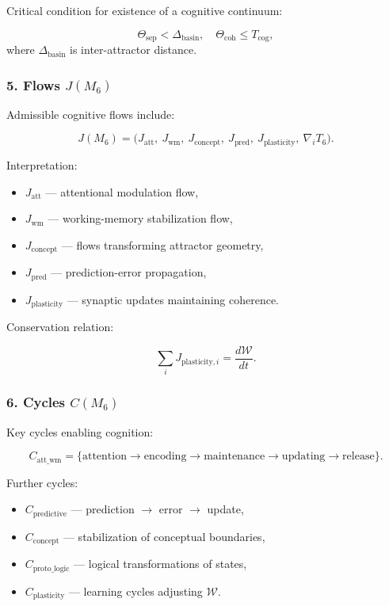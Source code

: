 Critical condition for existence of a cognitive continuum:

\[
\Theta_{\mathrm{sep}} < \Delta_{\mathrm{basin}},
\quad
\Theta_{\mathrm{coh}} \le T_{\mathrm{cog}},
\]
where $\Delta_{\mathrm{basin}}$ is inter-attractor distance.

\subsubsection*{5. Flows \texorpdfstring{$J(M_6)$}{J(M_6)}}

Admissible cognitive flows include:

\[
J(M_6) =
\big(
J_{\mathrm{att}},\
J_{\mathrm{wm}},\
J_{\mathrm{concept}},\
J_{\mathrm{pred}},\
J_{\mathrm{plasticity}},\
\nabla_i T_6
\big).
\]

Interpretation:

\begin{itemize}
    \item $J_{\mathrm{att}}$ — attentional modulation flow,
    \item $J_{\mathrm{wm}}$ — working-memory stabilization flow,
    \item $J_{\mathrm{concept}}$ — flows transforming attractor geometry,
    \item $J_{\mathrm{pred}}$ — prediction-error propagation,
    \item $J_{\mathrm{plasticity}}$ — synaptic updates maintaining coherence.
\end{itemize}

Conservation relation:

\[
\sum_i J_{\mathrm{plasticity},i} = \frac{d\mathcal{W}}{dt}.
\]

\subsubsection*{6. Cycles \texorpdfstring{$C(M_6)$}{C(M_6)}}

Key cycles enabling cognition:

\[
C_{\mathrm{att\_wm}}
= 
\{\text{attention} \to \text{encoding} \to 
\text{maintenance} \to \text{updating} \to \text{release}\}.
\]

Further cycles:

\begin{itemize}
    \item $C_{\mathrm{predictive}}$ — prediction $\to$ error $\to$ update,
    \item $C_{\mathrm{concept}}$ — stabilization of conceptual boundaries,
    \item $C_{\mathrm{proto\_logic}}$ — logical transformations of states,
    \item $C_{\mathrm{plasticity}}$ — learning cycles adjusting $\mathcal{W}$.
\end{itemize}

